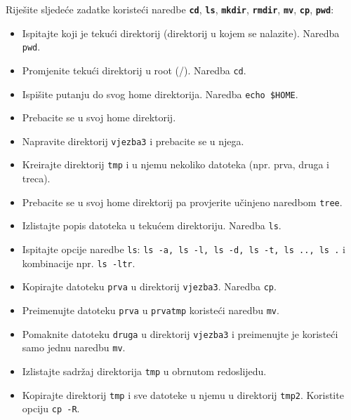 \begin{zadatak} Riješite sljedeće zadatke koristeći naredbe \textbf{\texttt{cd}}, \textbf{\texttt{ls}}, \textbf{\texttt{mkdir}}, \textbf{\texttt{rmdir}}, \textbf{\texttt{mv}}, \textbf{\texttt{cp}}, \textbf{\texttt{pwd}}:
\begin{itemize}
\item Ispitajte koji je tekući direktorij (direktorij u kojem se nalazite). Naredba \texttt{pwd}.
\item Promjenite tekući direktorij u root (/). Naredba \texttt{cd}.
\item Ispišite putanju do svog home direktorija. Naredba \texttt{echo \$HOME}.
\item Prebacite se u svoj home direktorij.
\item Napravite direktorij \texttt{vjezba3} i prebacite se u njega.
\item Kreirajte direktorij \texttt{tmp} i u njemu nekoliko datoteka (npr. prva, druga i treca).
\item Prebacite se u svoj home direktorij pa provjerite učinjeno naredbom \texttt{tree}.
\item Izlistajte popis datoteka u tekućem direktoriju. Naredba \texttt{ls}.
\item Ispitajte opcije naredbe \texttt{ls}: \texttt{ls -a, ls -l, ls -d, ls -t, ls .., ls .} i kombinacije npr. \texttt{ls -ltr}.
\item Kopirajte datoteku \texttt{prva} u direktorij \texttt{vjezba3}. Naredba \texttt{cp}.
\item Preimenujte datoteku \texttt{prva} u \texttt{prvatmp} koristeći naredbu \texttt{mv}.
\item Pomaknite datoteku \texttt{druga} u direktorij \texttt{vjezba3} i preimenujte je koristeći samo jednu naredbu \texttt{mv}.
\item Izlistajte sadržaj direktorija \texttt{tmp} u obrnutom redoslijedu.
\item Kopirajte direktorij \texttt{tmp} i sve datoteke u njemu u direktorij \texttt{tmp2}. Koristite opciju \texttt{cp -R}.
\end{itemize}
\end{zadatak}
